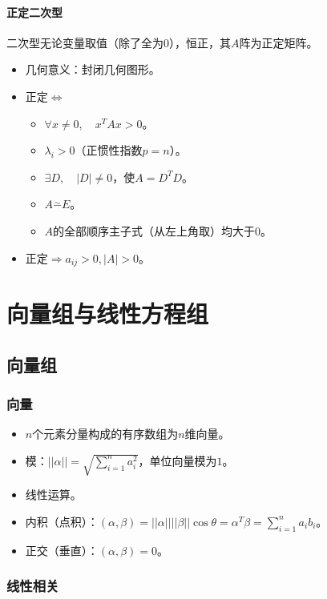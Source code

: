 \documentclass[
12pt, %
a4paper, 
oneside, %
]{scrartcl}
\begin{document}
\paragraph{正定二次型}
二次型无论变量取值（除了全为$ 0 $），恒正，其$ A $阵为正定矩阵。
\begin{itemize}
\item 几何意义：封闭几何图形。
\item 正定$ \Leftrightarrow $
\begin{itemize}
\item $ \forall x \neq 0, \quad x^T A x > 0 $。
\item $ \lambda_i > 0 $（正惯性指数$ p = n $）。
\item $ \exists D, \quad |D| \neq 0 $，使$ A = D^T D $。
\item $ A \overset{\sim}{-} E $。
\item $ A $的全部顺序主子式（从左上角取）均大于$ 0 $。
\end{itemize}
\item 正定$ \Rightarrow $$ a_{ij} > 0, |A| > 0 $。
\end{itemize}
\section{向量组与线性方程组}
\subsection[向量组]{向量组}
\subsubsection[向量]{向量}
\begin{itemize}
\item $ n $个元素分量构成的有序数组为$ n $维向量。
\item 模：$ ||\alpha|| = \sqrt{\sum_{i = 1}^n a_i^2} $，单位向量模为$ 1 $。
\item 线性运算。
\item 内积（点积）：$ (\alpha, \beta) = ||\alpha|| ||\beta|| \cos\theta = \alpha^T\beta = \sum_{i = 1}^n a_i b_i $。
\item 正交（垂直）：$ (\alpha, \beta) = 0 $。
\end{itemize}
\subsubsection[线性相关]{线性相关}
\end{document}
